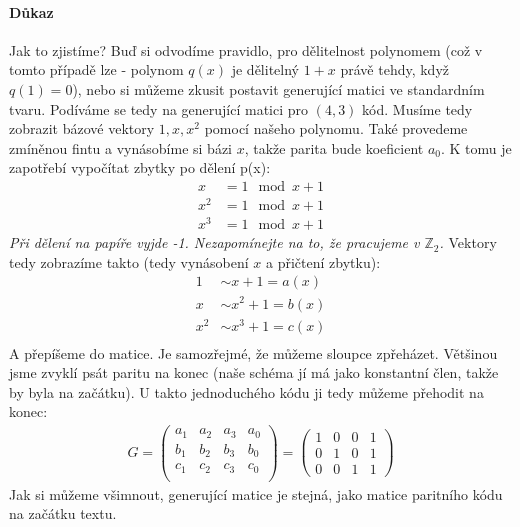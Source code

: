 \documentclass[a4paper,12pt]{article}
\newcommand{\Z}{\mathbb{Z}}
\begin{document}
\paragraph{Důkaz}
Jak to zjistíme? Buď si odvodíme pravidlo, pro dělitelnost polynomem (což v 
tomto případě lze - polynom $q(x)$ je dělitelný $1 + x$ právě tehdy, když $q(1) 
= 0$), nebo si můžeme zkusit postavit generující matici ve standardním tvaru.  
Podíváme se tedy na generující matici pro $(4,3)$ kód. Musíme tedy zobrazit 
bázové vektory $1, x, x^2$ pomocí našeho polynomu. Také provedeme zmíněnou fintu 
a vynásobíme si bázi $x$, takže parita bude koeficient $a_0$. K tomu je 
zapotřebí vypočítat zbytky po dělení p(x):
\begin{align}
	x &= 1 \mod x + 1\\
	x^2 &= 1 \mod x + 1\\
	x^3 &= 1 \mod x + 1
\end{align}
\textit{Při dělení na papíře vyjde -1. Nezapomínejte na to, že pracujeme v 
$\Z_2$.} Vektory tedy zobrazíme takto (tedy vynásobení $x$ a přičtení zbytku):
\begin{align}
	1 &\sim x + 1 = a(x)\\
	x &\sim x^2 + 1 = b(x)\\
	x^2 &\sim x^3 + 1 = c(x)\\
\end{align}
A přepíšeme do matice. Je samozřejmé, že můžeme sloupce zpřeházet. Většinou jsme 
zvyklí psát paritu na konec (naše schéma jí má jako konstantní člen, takže by 
byla na začátku). U takto jednoduchého kódu ji tedy můžeme přehodit na konec:
\begin{align}
	G = \left(
	\begin{matrix}
	a_1 & a_2 & a_3 & a_0 \\
	b_1 & b_2 & b_3 & b_0 \\
	c_1 & c_2 & c_3 & c_0 \\
	\end{matrix}
	\right) =
	\left(
	\begin{matrix}
	1 & 0 & 0 & 1 \\
	0 & 1 & 0 & 1 \\
	0 & 0 & 1 & 1 \end{matrix}
	\right)
\end{align}
Jak si můžeme všimnout, generující matice je stejná, jako matice paritního kódu 
na začátku textu.
\end{document}
